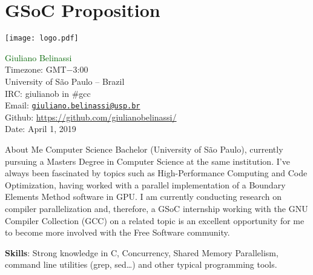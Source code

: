 \chapter{GSoC Proposition}
\label{ap:gsoc}


\begin{center}
\Huge \bf
\vspace{0.5cm}
\end{center}
\vspace*{\fill}
{
     \centering
     \texttt{[image: logo.pdf]}
    \par
}
\vspace*{\fill}
\normalsize{
\noindent\textcolor{darkgreen}{Giuliano Belinassi} \\
Timezone: GMT$-$3:00 \\
University of São Paulo -- Brazil \\
IRC: giulianob in \#gcc \\
Email: \href{mailto:giuliano.belinassi@usp.br}{\texttt{giuliano.belinassi@usp.br}} \\
Github: \url{https://github.com/giulianobelinassi/} \\
Date: April 1, 2019
}
\newpage

\begin{section}{About Me}
    Computer Science Bachelor (University of São Paulo), 
    currently pursuing a Masters Degree in Computer Science at the same
    institution. I've always been fascinated by topics such as
    High-Performance Computing and Code Optimization, having worked with
    a parallel implementation of a Boundary Elements Method software in GPU.
    I am currently conducting research on compiler parallelization and,
    therefore, a GSoC internship working with the GNU
    Compiler Collection (GCC) on a related topic is an excellent opportunity
    for me to become more involved with the Free Software community.

    \textbf{Skills}: Strong knowledge in C, Concurrency, Shared Memory Parallelism, command line utilities (grep, sed\dots) and other typical programming tools.
\end{section}

